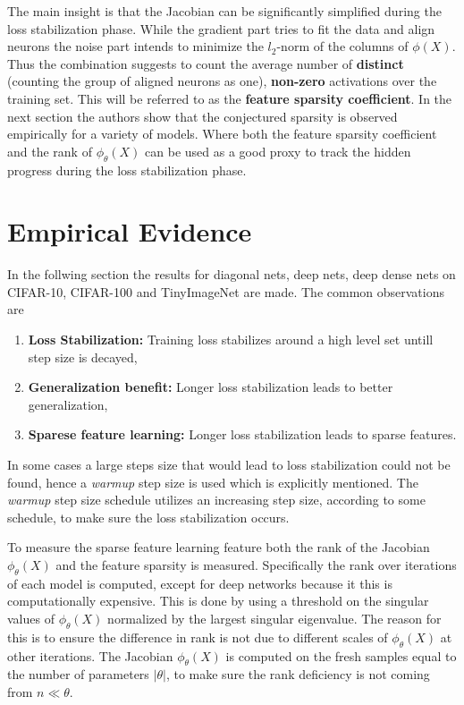 The main insight is that the Jacobian can be significantly simplified during
the loss stabilization phase. While the gradient part tries to fit the data
and align neurons the noise part intends to minimize the $l_2$-norm of the
columns of $\phi(X)$. Thus the combination suggests to count the average
number of \textbf{distinct} (counting the group of aligned neurons as one),
\textbf{non-zero} activations over the training set. This will be referred to
as the \textbf{feature sparsity coefficient}. In the next section the authors
show that the conjectured sparsity is observed empirically for a variety of
models. Where both the feature sparsity coefficient and the rank of
$\phi_\theta (X)$ can be used as a good proxy to track the hidden progress
during the loss stabilization phase.

\section{Empirical Evidence}
In the follwing section the results for diagonal nets, deep nets, deep dense
nets on CIFAR-10, CIFAR-100 and TinyImageNet are made. The common
observations are
\begin{enumerate}
    \item \textbf{Loss Stabilization:} Training loss stabilizes around a high
        level set untill step size is decayed,
    \item \textbf{Generalization benefit:} Longer loss stabilization leads
        to better generalization,
    \item \textbf{Sparese feature learning:} Longer loss stabilization
        leads to sparse features.
\end{enumerate}
In some cases a large steps size that would lead to loss stabilization could
not be found, hence a \textit{warmup} step size is used which is explicitly
mentioned. The \textit{warmup} step size schedule utilizes an increasing step
size, according to some schedule, to make sure the loss stabilization occurs.
\newline

To measure the sparse feature learning feature both the rank of the Jacobian
$\phi_{\theta}(X)$ and the feature sparsity is measured. Specifically the
rank over iterations of each model is computed, except for deep networks
because it this is computationally expensive. This is done by using a
threshold on the singular values of $\phi_\theta(X)$ normalized by the
largest singular eigenvalue. The reason for this is to ensure the difference
in rank is not due to different scales of $\phi_\theta(X)$ at other
iterations. The Jacobian $\phi_\theta(X)$ is computed on the fresh samples
equal to the number of parameters $ |\theta |$, to make sure the rank
deficiency is not coming from $n \ll \theta $.
\newline

